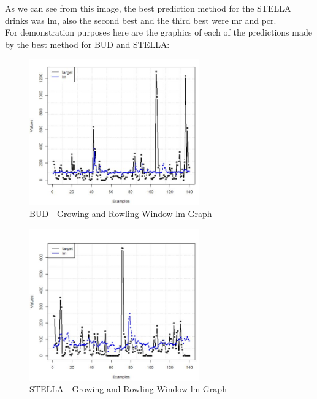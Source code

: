 As we can see from this image, the best prediction method for the STELLA drinks was lm, also the second best and the third best were mr and pcr.\\


For demonstration purposes here are the graphics of each of the predictions made by the best method for BUD and STELLA:


\begin{figure}[H]
    \centering
    \includegraphics[width=0.65\textwidth]{assets/bud-GW.jpeg}
    \caption{BUD - Growing and Rowling Window lm Graph}
    \label{fig:gw_bud}
    \end{figure}


\begin{figure}[H]
    \centering
    \includegraphics[width=0.65\textwidth]{assets/stella GW.jpeg}
    \caption{STELLA - Growing and Rowling Window lm Graph}
    \label{fig:gw_stella}
    \end{figure}
    